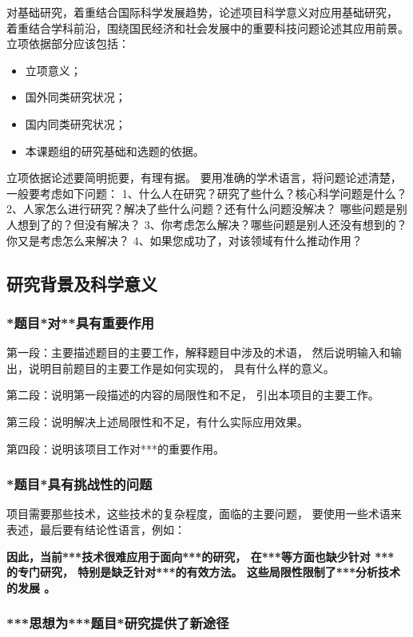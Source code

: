 \documentclass[12pt]{article}
\newcommand{\myEmph}[1]{\textbf{\textcolor[rgb]{0,0,0.25}{#1}}}
\begin{document}
对基础研究，着重结合国际科学发展趋势，论述项目科学意义对应用基础研究，
着重结合学科前沿，围绕国民经济和社会发展中的重要科技问题论述其应用前景。
%
立项依据部分应该包括：
\begin{itemize}
    \item 立项意义；
    \item 国外同类研究状况；
    \item 国内同类研究状况；
    \item 本课题组的研究基础和选题的依据。    
\end{itemize}
立项依据论述要简明扼要，有理有据。
要用准确的学术语言，将问题论述清楚，一般要考虑如下问题：
1、什么人在研究？研究了些什么？核心科学问题是什么？ 
2、人家怎么进行研究？解决了些什么问题？还有什么问题没解决？ 
哪些问题是别人想到了的？但没有解决？
3、你考虑怎么解决？哪些问题是别人还没有想到的？你又是考虑怎么来解决？
4、如果您成功了，对该领域有什么推动作用？


\subsection{研究背景及科学意义}

\subsubsection{*题目*对**具有重要作用}

第一段：主要描述题目的主要工作，解释题目中涉及的术语，
然后说明输入和输出，说明目前题目的主要工作是如何实现的，
具有什么样的意义。

第二段：说明第一段描述的内容的局限性和不足，
引出本项目的主要工作。

第三段：说明解决上述局限性和不足，有什么实际应用效果。

第四段：说明该项目工作对***的重要作用。


\subsubsection{*题目*具有挑战性的问题}

项目需要那些技术，这些技术的复杂程度，面临的主要问题，
要使用一些术语来表述，最后要有结论性语言，例如：

\myEmph{因此，当前***技术很难应用于面向***的研究，
在***等方面也缺少针对 *** 的专门研究，
特别是缺乏针对***的有效方法。
这些局限性限制了***分析技术的发展 。
}


\subsubsection{***思想为***题目*研究提供了新途径}
\end{document}
